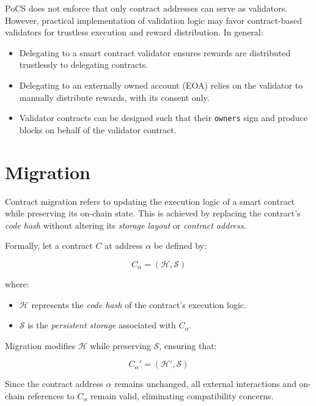 \documentclass{article}
\begin{document}
PoCS does not enforce that only contract addresses can serve as validators. However, practical implementation of validation logic may favor contract-based validators for trustless execution and reward distribution. In general:
\begin{itemize}
    \item Delegating to a smart contract validator ensures rewards are distributed trustlessly to delegating contracts.
    \item Delegating to an externally owned account (EOA) relies on the validator to manually distribute rewards, with its consent only.
    \item Validator contracts can be designed such that their \texttt{owners} sign and produce blocks on behalf of the validator contract.
\end{itemize}

\section{Migration}

Contract migration refers to updating the execution logic of a smart contract while preserving its on-chain state. This is achieved by replacing the contract’s \textit{code hash} without altering its \textit{storage layout} or \textit{contract address}.  

Formally, let a contract \( C \) at address \( \alpha \) be defined by:  

\begin{equation}
C_{\alpha} = (\mathcal{H}, \mathcal{S})
\end{equation}

where:  
\begin{itemize}
    \item \( \mathcal{H} \) represents the \textit{code hash} of the contract’s execution logic.  
    \item \( \mathcal{S} \) is the \textit{persistent storage} associated with \( C_{\alpha} \).  
\end{itemize}

Migration modifies \( \mathcal{H} \) while preserving \( \mathcal{S} \), ensuring that:  

\begin{equation}
C_{\alpha}' = (\mathcal{H}', \mathcal{S})
\end{equation}

Since the contract address \( \alpha \) remains unchanged, all external interactions and on-chain references to \( C_{\alpha} \) remain valid, eliminating compatibility concerns.  
\end{document}
